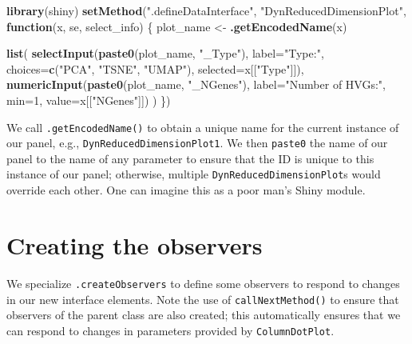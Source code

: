 \documentclass[
]{book}
\newenvironment{Shaded}{\begin{snugshade}}{\end{snugshade}}
\newcommand{\ControlFlowTok}[1]{\textcolor[rgb]{0.13,0.29,0.53}{\textbf{#1}}}
\newcommand{\DataTypeTok}[1]{\textcolor[rgb]{0.13,0.29,0.53}{#1}}
\newcommand{\DecValTok}[1]{\textcolor[rgb]{0.00,0.00,0.81}{#1}}
\newcommand{\KeywordTok}[1]{\textcolor[rgb]{0.13,0.29,0.53}{\textbf{#1}}}
\newcommand{\NormalTok}[1]{#1}
\newcommand{\StringTok}[1]{\textcolor[rgb]{0.31,0.60,0.02}{#1}}
\begin{document}
\begin{Shaded}
\begin{Highlighting}[]
\KeywordTok{library}\NormalTok{(shiny)}
\KeywordTok{setMethod}\NormalTok{(}\StringTok{".defineDataInterface"}\NormalTok{, }\StringTok{"DynReducedDimensionPlot"}\NormalTok{, }\ControlFlowTok{function}\NormalTok{(x, se, select_info) \{}
\NormalTok{    plot_name <-}\StringTok{ }\KeywordTok{.getEncodedName}\NormalTok{(x)}

    \KeywordTok{list}\NormalTok{(}
        \KeywordTok{selectInput}\NormalTok{(}\KeywordTok{paste0}\NormalTok{(plot_name, }\StringTok{"_Type"}\NormalTok{), }\DataTypeTok{label=}\StringTok{"Type:"}\NormalTok{,}
            \DataTypeTok{choices=}\KeywordTok{c}\NormalTok{(}\StringTok{"PCA"}\NormalTok{, }\StringTok{"TSNE"}\NormalTok{, }\StringTok{"UMAP"}\NormalTok{), }\DataTypeTok{selected=}\NormalTok{x[[}\StringTok{"Type"}\NormalTok{]]),}
        \KeywordTok{numericInput}\NormalTok{(}\KeywordTok{paste0}\NormalTok{(plot_name, }\StringTok{"_NGenes"}\NormalTok{), }\DataTypeTok{label=}\StringTok{"Number of HVGs:"}\NormalTok{,}
            \DataTypeTok{min=}\DecValTok{1}\NormalTok{, }\DataTypeTok{value=}\NormalTok{x[[}\StringTok{"NGenes"}\NormalTok{]])}
\NormalTok{    )}
\NormalTok{\})}
\end{Highlighting}
\end{Shaded}

We call \texttt{.getEncodedName()} to obtain a unique name for the current instance of our panel, e.g., \texttt{DynReducedDimensionPlot1}.
We then \texttt{paste0} the name of our panel to the name of any parameter to ensure that the ID is unique to this instance of our panel;
otherwise, multiple \texttt{DynReducedDimensionPlot}s would override each other.
One can imagine this as a poor man's Shiny module.

\hypertarget{creating-the-observers}{%
\section{Creating the observers}\label{creating-the-observers}}

We specialize \texttt{.createObservers} to define some observers to respond to changes in our new interface elements.
Note the use of \texttt{callNextMethod()} to ensure that observers of the parent class are also created;
this automatically ensures that we can respond to changes in parameters provided by \texttt{ColumnDotPlot}.
\end{document}

